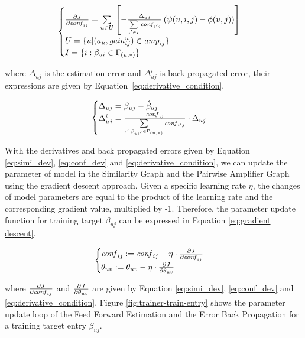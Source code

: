 \begin{equation}
  \label{eq:conf_dev}
  \begin{cases}
    \pa{J}{\confi{ij}}=\sum\limits_{u\in U} \left[ -\frac{\Delta_{uj}}{\sum\limits_{i'\in I} \confi{{i'}{j}}} \left(\psi(u,i,j) - \phi(u,j)\right) \right] \\
    U=\{u|(a_u,\gain{u}{ij})\in\amp{ij}\} \\
    I=\{i:\beta_{{u}{i}}\in\Gamma_{({u},*)}\}
  \end{cases}
\end{equation}

where $\Delta_{uj}$ is the estimation error and $\Delta_{uj}^{i}$ is
back propagated error, their expressions are given by
Equation~\ref{eq:derivative_condition}.

\begin{equation}
  \label{eq:derivative_condition}
  \begin{cases}
    \Delta_{uj}=\beta_{uj}-\hat{\beta}_{uj}\\
    \Delta_{uj}^{i}=\frac{\confi{ij}}{\sconf{u}{i'}{j}}\cdot \Delta_{uj}
  \end{cases}
\end{equation}

With the derivatives and back propagated errors given by Equation
\ref{eq:simi_dev}, \ref{eq:conf_dev} and
\ref{eq:derivative_condition}, we can update the parameter of {\sppan}
model in the Similarity Graph and the Pairwise Amplifier Graph using
the gradient descent approach. Given a specific learning rate $\eta$,
the changes of model parameters are equal to the product of the
learning rate and the corresponding gradient value, multiplied by
-1. Therefore, the parameter update function for training target
$\beta_{uj}$ can be expressed in Equation \ref{eq:gradient descent}.

\begin{equation}
  \label{eq:gradient descent}
  \begin{cases}
    \confi{ij} := \confi{ij}-\eta \cdot \pa{J}{\confi{ij}}\\
    \theta_{uv} := \theta_{uv} -\eta \cdot \pa{J}{\theta_{uv}}
  \end{cases}
\end{equation}

\noindent where $\frac{\partial {J}}{\partial {\mathit{conf}_{ij}}}$ and $\frac{\partial {J}}{\partial {\theta_{uv}}}$ are
given by Equation \ref{eq:simi_dev}, \ref{eq:conf_dev} and
\ref{eq:derivative_condition}. Figure \ref{fig:trainer-train-entry}
shows the parameter update loop of the Feed Forward Estimation and the
Error Back Propagation for a training target entry $\beta_{uj}$.

